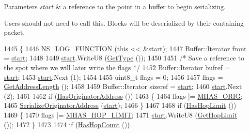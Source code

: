 \begin{DoxyParams}{Parameters}
{\em start} & a reference to the point in a buffer to begin serializing.\\
\hline
\end{DoxyParams}
Users should not need to call this. Blocks will be deserialized by their containing packet. 
\begin{DoxyCode}
1445 \{
1446   \hyperlink{log-macros-disabled_8h_a90b90d5bad1f39cb1b64923ea94c0761}{NS\_LOG\_FUNCTION} (\textcolor{keyword}{this} << &\hyperlink{namespacevisualizer_1_1core_a2a35e5d8a34af358b508dac8635754e0}{start});
1447   Buffer::Iterator front = \hyperlink{namespacevisualizer_1_1core_a2a35e5d8a34af358b508dac8635754e0}{start};
1448 
1449   \hyperlink{namespacevisualizer_1_1core_a2a35e5d8a34af358b508dac8635754e0}{start}.WriteU8 (\hyperlink{classns3_1_1PbbMessage_ad720b67118bbe16669019b7344903cd9}{GetType} ());
1450 
1451   \textcolor{comment}{/* Save a reference to the spot where we will later write the flags */}
1452   Buffer::Iterator bufref = \hyperlink{namespacevisualizer_1_1core_a2a35e5d8a34af358b508dac8635754e0}{start};
1453   \hyperlink{namespacevisualizer_1_1core_a2a35e5d8a34af358b508dac8635754e0}{start}.Next (1);
1454 
1455   uint8\_t flags = 0;
1456 
1457   flags = \hyperlink{classns3_1_1PbbMessage_abc3011e4ca197ddc8ae7a9a1f18d779f}{GetAddressLength} ();
1458 
1459   Buffer::Iterator sizeref = \hyperlink{namespacevisualizer_1_1core_a2a35e5d8a34af358b508dac8635754e0}{start};
1460   \hyperlink{namespacevisualizer_1_1core_a2a35e5d8a34af358b508dac8635754e0}{start}.Next (2);
1461 
1462   \textcolor{keywordflow}{if} (\hyperlink{classns3_1_1PbbMessage_a7d64dd0abb8306bb13cb6f1124f35c3c}{HasOriginatorAddress} ())
1463     \{
1464       flags |= \hyperlink{packetbb_8cc_adaf4884d9f85dc84a7dc33540d07f4a8}{MHAS\_ORIG};
1465       \hyperlink{classns3_1_1PbbMessage_ab224036cc9b2318b2ec8c11b9e439dee}{SerializeOriginatorAddress} (\hyperlink{namespacevisualizer_1_1core_a2a35e5d8a34af358b508dac8635754e0}{start});
1466     \}
1467 
1468   \textcolor{keywordflow}{if} (\hyperlink{classns3_1_1PbbMessage_a5bad52e536a9a2116a7f66b3c8d2054b}{HasHopLimit} ())
1469     \{
1470       flags |= \hyperlink{packetbb_8cc_a49f9e99b01c4c1ce96a1b4c4a00f7f97}{MHAS\_HOP\_LIMIT};
1471       \hyperlink{namespacevisualizer_1_1core_a2a35e5d8a34af358b508dac8635754e0}{start}.WriteU8 (\hyperlink{classns3_1_1PbbMessage_a938893c819b1f04baa8738cbc3ea6d19}{GetHopLimit} ());
1472     \}
1473 
1474   \textcolor{keywordflow}{if} (\hyperlink{classns3_1_1PbbMessage_ac6c535503fda3849f8ab99792416efd2}{HasHopCount} ())

\end{DoxyCode}
